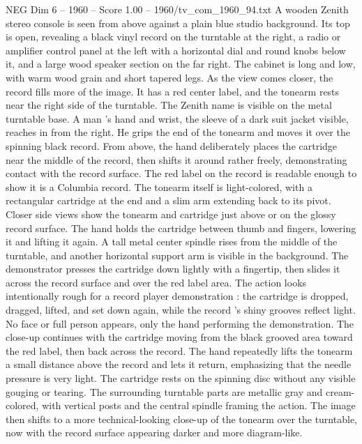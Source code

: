 \begin{textsample}{NEG Dim 6 – 1960 – Score 1.00 – 1960/tv\_com\_1960\_94.txt}  \label{ex:f6_neg_080}
A wooden Zenith stereo console is seen from above against a plain blue studio background.
Its top is open, revealing a black vinyl record on the turntable at the right, a radio or amplifier control panel at the left with a horizontal dial and round knobs below it, and a large wood speaker section on the far right.
The cabinet is long and low, with warm wood grain and short tapered legs.
As the view comes closer, the record fills more of the image.
It has a red center label, and the tonearm rests near the right side of the turntable.
The Zenith name is visible on the metal turntable base.
A man ’s hand and wrist, the sleeve of a dark suit jacket visible, reaches in from the right.
He grips the end of the tonearm and moves it over the spinning black record.
From above, the hand deliberately places the cartridge near the middle of the record, then shifts it around rather freely, demonstrating contact with the record surface.
The red label on the record is readable enough to show it is a Columbia record.
The tonearm itself is light-colored, with a rectangular cartridge at the end and a slim arm extending back to its pivot.
Closer side views show the tonearm and cartridge just above or on the glossy record surface.
The hand holds the cartridge between thumb and fingers, lowering it and lifting it again.
A tall metal center spindle rises from the middle of the turntable, and another horizontal support arm is visible in the background.
The demonstrator presses the cartridge down lightly with a fingertip, then slides it across the record surface and over the red label area.
The action looks intentionally rough for a record player demonstration : the cartridge is dropped, dragged, lifted, and set down again, while the record ’s shiny grooves reflect light.
No face or full person appears, only the hand performing the demonstration.
The close-up continues with the cartridge moving from the black grooved area toward the red label, then back across the record.
The hand repeatedly lifts the tonearm a small distance above the record and lets it return, emphasizing that the needle pressure is very light.
The cartridge rests on the spinning disc without any visible gouging or tearing.
The surrounding turntable parts are metallic gray and cream-colored, with vertical posts and the central spindle framing the action.
The image then shifts to a more technical-looking close-up of the tonearm over the turntable, now with the record surface appearing darker and more diagram-like.

\end{textsample}
